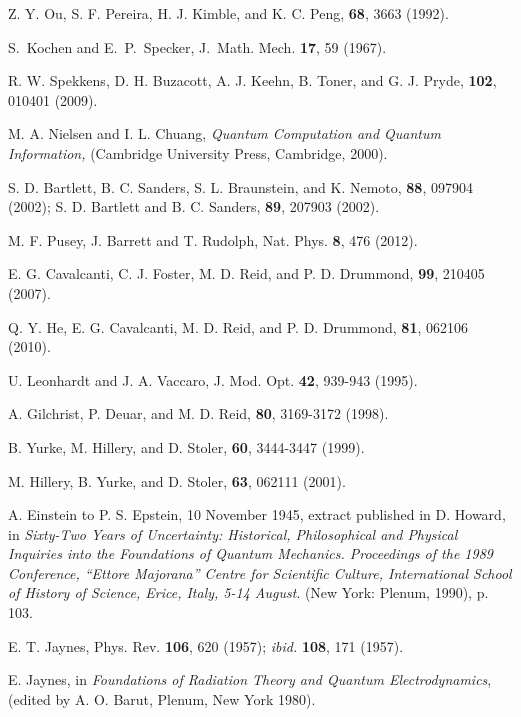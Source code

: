 \documentclass[pra,superscriptaddress,nofootinbib,12pt]{revtex4-2}
\begin{document}
\begin{thebibliography}{9}
  Z. Y. Ou, S. F. Pereira, H. J. Kimble, and K. C. Peng, \prl \textbf{68}, 3663 (1992).



 S.~Kochen and E.~P.~Specker, J.~Math. Mech. {\bf 17}, 59 (1967).

 R. W. Spekkens, D. H. Buzacott, A. J. Keehn, B. Toner, and G. J. Pryde, \prl \textbf{102}, 010401 (2009).

 M. A. Nielsen and I. L. Chuang, \textit{Quantum Computation and Quantum Information,} (Cambridge University Press, Cambridge, 2000).

 S. D. Bartlett, B. C. Sanders, S. L. Braunstein, and K. Nemoto, \prl \textbf{88}, 097904 (2002); S. D. Bartlett and B. C. Sanders, \prl \textbf{89}, 207903 (2002).



 M. F. Pusey, J. Barrett and T. Rudolph, Nat. Phys. \textbf{8}, 476 (2012).


 E. G. Cavalcanti, C. J. Foster, M. D. Reid, and P. D. Drummond, \prl \textbf{99}, 210405 (2007).

 Q. Y. He, E. G. Cavalcanti, M. D. Reid, and P. D. Drummond, \pra \textbf{81}, 062106 (2010).

 U. Leonhardt and J. A. Vaccaro, J. Mod. Opt. \textbf{42}, 939-943 (1995).

 A. Gilchrist, P. Deuar, and M. D. Reid, \prl \textbf{80}, 3169-3172 (1998).

 B. Yurke, M. Hillery, and D. Stoler, \pra \textbf{60}, 3444-3447 (1999).

 M. Hillery, B. Yurke, and D. Stoler, \pra \textbf{63}, 062111 (2001).

 A. Einstein to P. S. Epstein, 10 November 1945, extract
published in D. Howard, in \textit{Sixty-Two Years of Uncertainty: Historical, Philosophical and Physical Inquiries into the Foundations of Quantum Mechanics. Proceedings of the 1989 Conference, ``Ettore Majorana'' Centre for Scientific Culture, International School of History of Science, Erice, Italy, 5-14 August}. (New York: Plenum, 1990), p. 103.

 E. T. Jaynes, Phys. Rev. \textbf{106}, 620 (1957); \textit{ibid.} \textbf{108}, 171 (1957).

 E. Jaynes, in
\textit{Foundations of Radiation Theory and Quantum Electrodynamics}, (edited by A.
O. Barut, Plenum, New York 1980).


\end{thebibliography}
\end{document}
